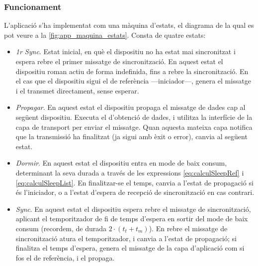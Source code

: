 \documentclass{tfgitic}[2024/07/01]
\begin{document}
{\subsubsection{Funcionament}
L'aplicació s'ha implementat com una màquina d'estats, el diagrama de la qual es pot veure a la \autoref{fig:app_maquina_estats}. Consta de quatre estats:
\begin{itemize}
    \item \emph{1r Sync}. Estat inicial, en què el dispositiu no ha estat mai sincronitzat i espera rebre el primer missatge de sincronització. En aquest estat el dispositiu roman actiu de forma indefinida, fins a rebre la sincronització. En el cas que el dispositiu sigui el de referència ---iniciador---, genera el missatge i el transmet directament, sense esperar.
    \item \emph{Propagar}. En aquest estat el dispositiu propaga el missatge de dades cap al següent dispositiu. Executa el  d'obtenció de dades, i utilitza la interfície de la capa de transport per enviar el missatge. Quan aquesta mateixa capa notifica que la transmissió ha finalitzat (ja sigui amb èxit o error), canvia al següent estat.
    \item \emph{Dormir}. En aquest estat el dispositiu entra en mode de baix consum, determinant la seva durada a través de les expressions \ref{eq:calculSleepRef} i \ref{eq:calculSleepList}. En finalitzar-se el temps, canvia a l'estat de propagació si és l'iniciador, o a l'estat d'espera de recepció de sincronització en cas contrari.
    \item \emph{Sync}. En aquest estat el dispositiu espera rebre el missatge de sincronització, aplicant el temporitzador de fi de temps d'espera en sortir del mode de baix consum (recordem, de durada $2\cdot (t_t+t_m)$). En rebre el missatge de sincronització atura el temporitzador, i canvia a l'estat de propagació; si finalitza el temps d'espera, genera el missatge de la capa d'aplicació com si fos el de referència, i el propaga.
\end{itemize}

\begin{figure}
    \centering
\end{figure}}
\end{document}
